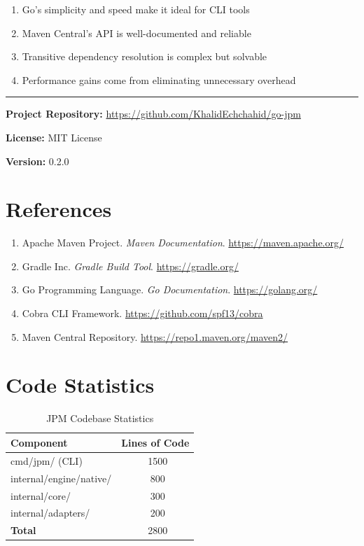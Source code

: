 \documentclass[12pt,a4paper]{report}
\begin{document}
\begin{enumerate}
    \item Go's simplicity and speed make it ideal for CLI tools
    \item Maven Central's API is well-documented and reliable
    \item Transitive dependency resolution is complex but solvable
    \item Performance gains come from eliminating unnecessary overhead
\end{enumerate}

\vspace{1cm}
\hrule
\vspace{0.5cm}

\textbf{Project Repository:} \url{https://github.com/KhalidEchchahid/go-jpm}

\textbf{License:} MIT License

\textbf{Version:} 0.2.0

\chapter*{References}

\begin{enumerate}
    \item Apache Maven Project. \textit{Maven Documentation}. \url{https://maven.apache.org/}
    \item Gradle Inc. \textit{Gradle Build Tool}. \url{https://gradle.org/}
    \item Go Programming Language. \textit{Go Documentation}. \url{https://golang.org/}
    \item Cobra CLI Framework. \url{https://github.com/spf13/cobra}
    \item Maven Central Repository. \url{https://repo1.maven.org/maven2/}
\end{enumerate}

\appendix
\chapter{Code Statistics}

\begin{table}[H]
\centering
\begin{tabular}{lc}
\toprule
\textbf{Component} & \textbf{Lines of Code} \\
\midrule
cmd/jpm/ (CLI) & ~1500 \\
internal/engine/native/ & ~800 \\
internal/core/ & ~300 \\
internal/adapters/ & ~200 \\
\midrule
\textbf{Total} & ~2800 \\
\bottomrule
\end{tabular}
\caption{JPM Codebase Statistics}
\end{table}
\end{document}
